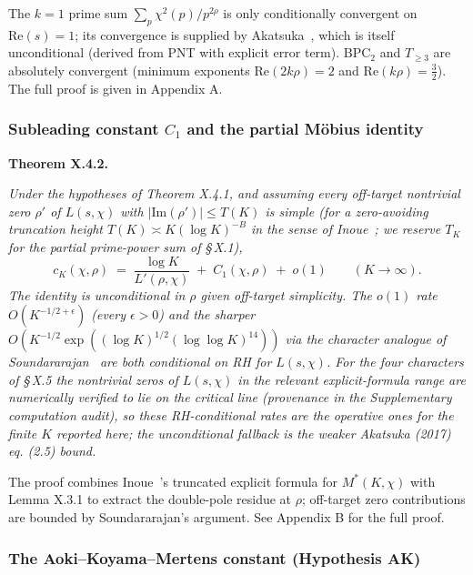 The \(k = 1\) prime sum \(\sum_p \chi^2(p) / p^{2\rho}\) is only
conditionally convergent on \(\mathrm{Re}(s) = 1\); its convergence is
supplied by Akatsuka~\cite[Lemma~2.1 \& eq.~(2.5)]{AkatsukaH2013EulerProduct}, which is itself
unconditional (derived from PNT with explicit error term). \(\mathrm{BPC}_2\)
and \(T_{\ge 3}\) are absolutely convergent (minimum exponents
\(\mathrm{Re}(2k\rho) = 2\) and \(\mathrm{Re}(k\rho) = \tfrac32\)). The
full proof is given in Appendix A.

\subsubsection{Subleading constant \(C_1\) and the partial Möbius identity}

\hypertarget{theorem:X.4.2}{\textbf{Theorem X.4.2.}} \emph{Under the hypotheses of Theorem X.4.1, and
assuming every off-target nontrivial zero \(\rho'\) of \(L(s,\chi)\) with
\(|\mathrm{Im}(\rho')| \le T(K)\) is simple (for a zero-avoiding
truncation height \(T(K) \asymp K (\log K)^{-B}\) in the sense of
Inoue~\cite[Theorem~1]{Inoue2021}; we reserve \(T_K\) for the partial prime-power
sum of \S\,X.1),}
\begin{equation}
\label{eq:cK}
c_K(\chi,\rho) \;=\; \frac{\log K}{L'(\rho,\chi)} \;+\; C_1(\chi,\rho) \;+\; o(1)
\qquad (K \to \infty).
\end{equation}
\emph{The identity is unconditional in \(\rho\) given off-target simplicity.
The \(o(1)\) rate \(O(K^{-1/2+\epsilon})\) (every \(\epsilon > 0\)) and
the sharper \(O(K^{-1/2}\exp((\log K)^{1/2}(\log\log K)^{14}))\) via
the character analogue of Soundararajan~\cite[Theorem~1]{Soundararajan2009} are both
conditional on RH for \(L(s,\chi)\). For the four characters of \S\,X.5
the nontrivial zeros of \(L(s,\chi)\) in the relevant
explicit-formula range are numerically verified to lie on the
critical line (provenance in the Supplementary computation audit),
so these RH-conditional rates are the operative ones for the
finite \(K\) reported here; the unconditional fallback is the weaker
Akatsuka (2017) eq. (2.5) bound.}

The proof combines Inoue~\cite[Theorem~1]{Inoue2021}'s truncated explicit
formula for \(M^*(K,\chi)\) with Lemma X.3.1 to extract the double-pole
residue at \(\rho\); off-target zero contributions are bounded by
Soundararajan's argument. See Appendix B for the full proof.

\subsubsection{The Aoki--Koyama--Mertens constant (Hypothesis AK)}

